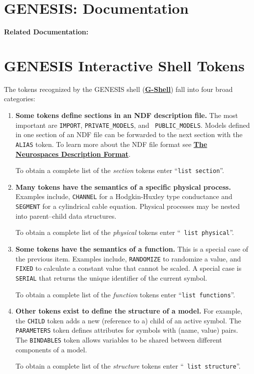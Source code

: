 \documentclass[12pt]{article}
\begin{document}
\section*{GENESIS: Documentation}

{\bf Related Documentation:}

\section*{GENESIS Interactive Shell Tokens}

The tokens recognized by the GENESIS shell (\href{../gshell/gshell.tex}{\bf G-Shell}) fall into four broad categories:

\begin{enumerate}

\item {\bf Some tokens define sections in an NDF description file.}
  The most important are {\tt IMPORT}, {\tt PRIVATE\_MODELS}, and {\tt
    PUBLIC\_MODELS}. Models defined in one section of an NDF file can
  be forwarded to the next section with the {\tt ALIAS} token. To learn more
  about the NDF file format see \href{../ndf-file-format/ndf-file-format.tex}{\bf The
  Neurospaces Description Format}.

  
  To obtain a complete list of the {\it section} tokens enter ``{\tt list
    section}''.
    
\item {\bf Many tokens have the semantics of a specific physical
    process.} Examples include, {\tt CHANNEL} for a Hodgkin-Huxley
  type conductance and {\tt SEGMENT} for a cylindrical cable equation.
  Physical processes may be nested into parent--child data structures.
  
  To obtain a complete list of the {\it physical} tokens enter ``{\tt
    list physical}''.

\item {\bf Some tokens have the semantics of a function.} This is a
  special case of the previous item. Examples include, {\tt RANDOMIZE}
  to randomize a value, and {\tt FIXED} to calculate a constant value
  that cannot be scaled. A special case is {\tt SERIAL} that returns
  the unique identifier of the current symbol. 
  
  To obtain a complete
  list of the {\it function} tokens enter ``{\tt list functions}''.

\item {\bf Other tokens exist to define the structure of a model.} For
  example, the {\tt CHILD} token adds a new (reference to a) child of
  an active symbol. The {\tt PARAMETERS} token defines attributes for
  symbols with (name, value) pairs. The {\tt BINDABLES} token allows
  variables to be shared between different components of a model.
  
  To obtain a complete list of the {\it structure} tokens enter ``{\tt
    list structure}''.

\end{enumerate}
\end{document}
